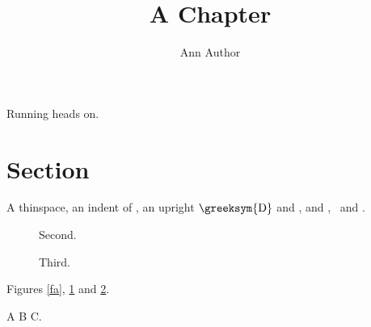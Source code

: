 \documentclass{svmult}
\begin{document}
\title*{A Chapter}
\author{Ann Author}
\maketitle
\makeatletter\if@runhead Running heads on.\fi\makeatother
\section{Section}
A thin\ts space, an indent of \the\svparindent, an upright $\mbox{\greeksym{D}}$ and \mbox{}, and
\apj, \mnras\ and \aap.
\begin{figure}
\subfigures
{}\caption{First.}\label{fa}
\caption{Second.}\label{fb}
\end{figure}
\begin{figure}\caption{Third.}\label{fc}\end{figure}
Figures \ref{fa}, \ref{fb} and \ref{fc}.
\begin{abbrsymblist}[ABC]
\item[ABC] A B C.
\end{abbrsymblist}
\end{document}
